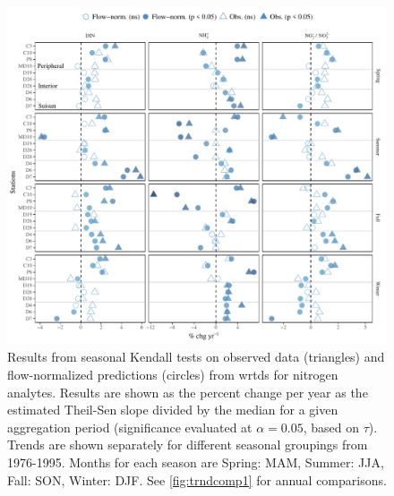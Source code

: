 \documentclass[letterpaper,12pt,oneside]{article}\usepackage[]{graphicx}\usepackage[]{color}
\begin{document}
\begin{figure}
\centering
\includegraphics[width=1\textwidth,page=1]{figs/trndcomp2.pdf}
\caption{Results from seasonal Kendall tests on observed data (triangles) and flow-normalized predictions (circles) from \ac{wrtds} for nitrogen analytes. Results are shown as the percent change per year as the estimated Theil-Sen slope divided by the median for a given aggregation period (significance evaluated at $\alpha = 0.05$, based on $\tau$). Trends are shown separately for different seasonal groupings from 1976-1995. Months for each season are Spring: MAM, Summer: JJA, Fall: SON, Winter: DJF. See \cref{fig:trndcomp1} for annual comparisons.}
\label{fig:trndcomp2}   
\end{figure}
\end{document}
